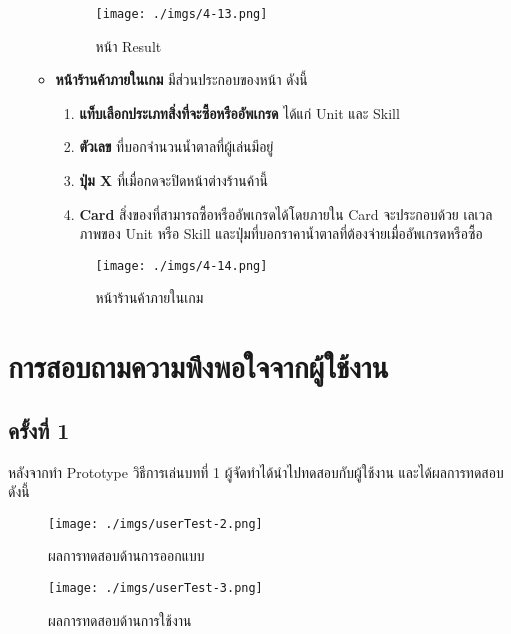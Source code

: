 \documentclass[12pt,oneside,openright,a4paper]{cpe-thai-project}
\begin{document}
\begin{enumerate}
\begin{itemize}
      \begin{figure}[H]\centering
        \texttt{[image: ./imgs/4-13.png]}
        \caption{หน้า Result}\label{fig:4-13}
      \end{figure}

      \item \textbf{หน้าร้านค้าภายในเกม} มีส่วนประกอบของหน้า ดังนี้ 
      \begin{enumerate}
        \item \textbf{แท็บเลือกประเภทสิ่งที่จะซื้อหรืออัพเกรด} ได้แก่ Unit และ Skill 
        \item \textbf{ตัวเลข} ที่บอกจำนวนน้ำตาลที่ผู้เล่นมีอยู่ 
        \item \textbf{ปุ่ม X} ที่เมื่อกดจะปิดหน้าต่างร้านค้านี้ 
        \item \textbf{Card} สิ่งของที่สามารถซื้อหรืออัพเกรดได้โดยภายใน Card จะประกอบด้วย เลเวล 
        ภาพของ Unit หรือ Skill และปุ่มที่บอกราคาน้ำตาลที่ต้องจ่ายเมื่ออัพเกรดหรือซื้อ 
      \end{enumerate}

      \begin{figure}[H]\centering
        \texttt{[image: ./imgs/4-14.png]}
        \caption{หน้าร้านค้าภายในเกม}\label{fig:4-14}
      \end{figure}

    \end{itemize}

\end{enumerate}

\pagebreak
\section{การสอบถามความพึงพอใจจากผู้ใช้งาน}
  
  \subsection{ครั้งที่ 1}
  หลังจากทำ Prototype วิธีการเล่นบทที่ 1 ผู้จัดทำได้นำไปทดสอบกับผู้ใช้งาน และได้ผลการทดสอบ ดังนี้

  \begin{figure}[H]\centering
    \texttt{[image: ./imgs/userTest-2.png]}
    \caption{ผลการทดสอบด้านการออกแบบ}\label{fig:userTest-2}
  \end{figure}

  \begin{figure}[H]\centering
    \texttt{[image: ./imgs/userTest-3.png]}
    \caption{ผลการทดสอบด้านการใช้งาน}\label{fig:userTest-3}
  \end{figure}
\end{document}
